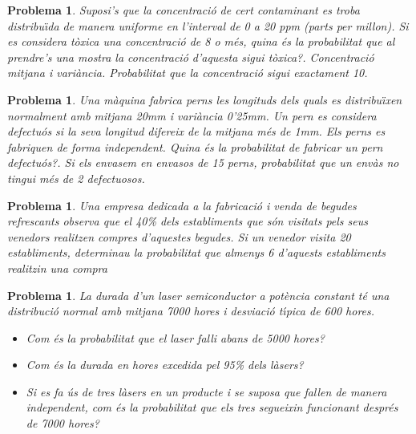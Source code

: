 \documentclass[11pt]{article}
\newcounter{prbcont}
\newtheorem{problema}[prbcont]{Problema}
\newcommand{\sol}[1]{{\textbf{\footnotetext[\the\problemes]{Sol.: #1} }}}
\begin{document}
\begin{problema}
Suposi's que la concentraci\'o de cert contaminant es troba distribu\"{\i}da de manera uniforme en l'interval de 0 a 20 ppm (parts per millon). Si es considera t\`oxica una concentraci\'o de 8 o m\'es, quina \'es la probabilitat que al prendre's una mostra la concentraci\'o d'aquesta sigui t\`oxica?. Concentraci\'o mitjana i vari\`ancia. Probabilitat que la concentraci\'o sigui exactament 10. %
\end{problema}


\begin{problema}
Una m\`aquina fabrica perns les longituds dels quals es distribu\"{\i}xen normalment amb mitjana 20mm i vari\`ancia 0'25mm. Un pern es considera defectu\'os si la seva longitud difereix de la mitjana m\'es de 1mm. Els perns es fabriquen de forma independent. Quina \'es la probabilitat de fabricar un pern defectu\'os?. Si els envasem en envasos de 15 perns, probabilitat que un env\`as no tingui m\'es de 2 defectuosos. %
\end{problema}

\begin{problema}
Una empresa dedicada a la fabricaci\'o i venda de begudes refrescants observa que el 40\% dels establiments que s\'on visitats pels seus venedors realitzen compres d'aquestes begudes. Si un venedor visita 20 establiments, determinau la probabilitat que almenys 6 d'aquests establiments realitzin una compra %
\end{problema}

\begin{problema}
La durada d'un laser semiconductor a pot\`encia constant t\'e una distribuci\'o normal amb mitjana 7000 hores i desviaci\'o t\'{\i}pica de 600 hores. 
\begin{itemize}
\item Com \'es la probabilitat que el laser falli abans de 5000 hores? 
\item Com \'es la durada en hores excedida pel 95\% dels l\`asers? 
\item Si es fa \'us de tres l\`asers en un producte i se suposa que fallen de manera independent, com \'es la probabilitat que els tres segueixin funcionant despr\'es de 7000 hores? 
\end{itemize}%
\end{problema}
\end{document}
